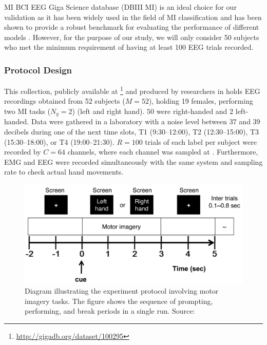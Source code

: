 MI BCI EEG Giga Science database (DBIII MI) is an ideal choice for our validation as it has been widely used in the field of MI classification and has been shown to provide a robust benchmark for evaluating the performance of different models \cite{cho2017eeg}.
However, for the purpose of our study, we will only consider 50 subjects who met the minimum requirement of having at least 100 EEG trials recorded.

\subsubsection{Protocol Design}

This collection, publicly available at \footnote{\url{http://gigadb.org/dataset/100295}} and produced by researchers in \cite{cho2017eeg} holds EEG recordings obtained from 52 subjects ($M=52$), holding 19 females, performing two MI tasks ($N_y=2$) (left and right hand). $50$ were right-handed and $2$ left-handed. Data were gathered in a laboratory with a noise level between $37$ and $39$ decibels during one of the next time slots, T1 (9:30–12:00), T2 (12:30–15:00), T3 (15:30–18:00), or T4 (19:00–21:30).  $R=100$ trials of each label per subject were recorded by $C=64$ channels, where each channel was sampled at . Furthermore, EMG and EEG were recorded simultaneously with the same system and sampling rate to check actual hand movements.

\begin{figure}[h!]
\centering
    \includegraphics[width=0.7\linewidth]{Figures/preliminaries/protocol_giga.PNG}
    \caption{Diagram illustrating the experiment protocol involving motor imagery tasks. The figure shows the sequence of prompting, performing, and break periods in a single run. Source: \cite{cho2017eeg} \label{fig:protocol_giga}}
\end{figure}

